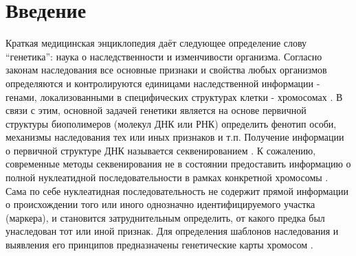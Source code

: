 \documentclass{matmex-diploma-custom}
\begin{document}
\maketitle \tableofcontents
\section*{Введение}

Краткая медицинская энциклопедия \cite{petrovsky1989} даёт следующее
определение слову “генетика”: наука о наследственности и изменчивости
организма. Согласно законам наследования все основные признаки и
свойства любых организмов определяются и контролируются единицами
наследственной информации - генами, локализованными в специфических
структурах клетки - хромосомах
\cite{griffiths2005introduction,griffiths2000introduction}. В связи с
этим, основной задачей генетики является на основе первичной структуры
биополимеров (молекул ДНК или РНК) определить фенотип особи, механизмы
наследования тех или иных признаков и т.п. Получение информации о
первичной структуре ДНК называется секвенированием \cite{cito1994}. К
сожалению, современные методы секвенирования не в состоянии
предоставить информацию о полной нуклеатидной последовательности в
рамках конкретной хромосомы \cite{molecular}. Сама по себе
нуклеатидная последовательность не содержит прямой информации о
происхождении того или иного однозначно идентифицируемого участка
(маркера), и становится затруднительным определить, от какого предка
был унаследован тот или иной признак. Для определения шаблонов
наследования и выявления его принципов предназначены генетические
карты хромосом \cite{morgan1922mechanism}.
\end{document}
